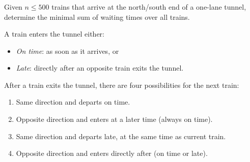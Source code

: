 \begin{frame}
    \frametitle{\problemtitle}
    \begin{description}
        \item<+->[Problem:] Given $n \leq 500$ trains that arrive at the
          north/south end of a one-lane tunnel, determine the minimal
          sum of waiting times over all trains.
        \item<+->[Insight:] A train enters the tunnel either:
          \begin{itemize}
            \item \emph{On time}: as soon as it arrives, or
            \item \emph{Late}: directly after an opposite train exits the tunnel.
          \end{itemize}
        \item<+-> [Insight:] After a train exits the tunnel, there are four possibilities
          for the next train:
          \begin{enumerate}
            \item Same direction and departs on time.
            \item Opposite direction and enters at a later time (always on time).
            \item Same direction and departs late, at the same time as current train.
            \item Opposite direction and enters directly after (on time or late).
          \end{enumerate}
    \end{description}
\end{frame}

